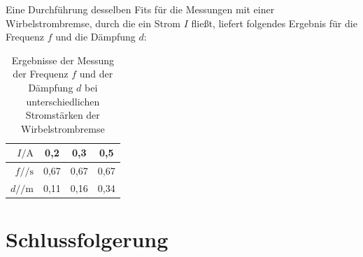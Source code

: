 \documentclass[
	a4paper,
	12pt,
	pagesize,
	ngerman
]{scrartcl}
\begin{document}
	Eine Durchführung desselben Fits für die Messungen mit einer Wirbelstrombremse, durch die ein Strom $ I $ fließt, liefert folgendes Ergebnis für die Frequenz $ f $ und die Dämpfung $ d $:\\
	\begin{table}[h]
		\centering
		\begin{tabular}{ r | c | c | c |}
			$I /\si{\ampere}$& 0,2 & 0,3 & 0,5\\ \hline
			$f  /\si{\per \second}$ & 0,67 & 0,67 & 0,67\\
			$d /\si{\per \meter}  $ & 0,11 & 0,16 & 0,34
		\end{tabular}
		\caption{Ergebnisse der Messung der Frequenz $ f $ und der Dämpfung $ d $ bei unterschiedlichen Stromstärken der Wirbelstrombremse}
	\end{table}
	
	\section{Schlussfolgerung}
	
\end{document}
